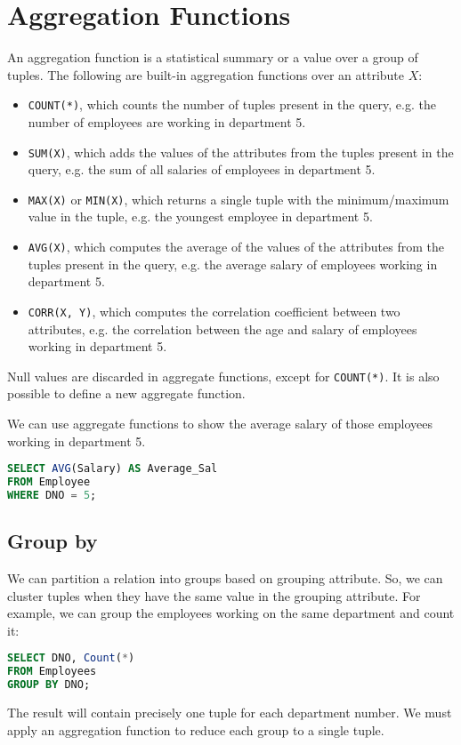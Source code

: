 \documentclass[a4paper, openany]{memoir}
\begin{document}
\section{Aggregation Functions}
An aggregation function is a statistical summary or a value over a group of tuples. The following are built-in aggregation functions over an attribute $X$:
\begin{itemize}
    \item \texttt{COUNT(*)}, which counts the number of tuples present in the query, e.g. the number of employees are working in department 5.
    \item \texttt{SUM(X)}, which adds the values of the attributes from the tuples present in the query, e.g. the sum of all salaries of employees in department 5.
    \item \texttt{MAX(X)} or \texttt{MIN(X)}, which returns a single tuple with the minimum/maximum value in the tuple, e.g. the youngest employee in department 5.
    \item \texttt{AVG(X)}, which computes the average of the values of the attributes from the tuples present in the query, e.g. the average salary of employees working in department 5.
    \item \texttt{CORR(X, Y)}, which computes the correlation coefficient between two attributes, e.g. the correlation between the age and salary of employees working in department 5.
\end{itemize}
Null values are discarded in aggregate functions, except for \texttt{COUNT(*)}. It is also possible to define a new aggregate function.

We can use aggregate functions to show the average salary of those employees working in department 5.
\begin{lstlisting}[language=SQL]
SELECT AVG(Salary) AS Average_Sal
FROM Employee
WHERE DNO = 5;
\end{lstlisting}

\subsection{Group by}
We can partition a relation into groups based on grouping attribute. So, we can cluster tuples when they have the same value in the grouping attribute. For example, we can group the employees working on the same department and count it:
\begin{lstlisting}[language=SQL]
SELECT DNO, Count(*)
FROM Employees
GROUP BY DNO;
\end{lstlisting}
The result will contain precisely one tuple for each department number. We must apply an aggregation function to reduce each group to a single tuple.
\end{document}
